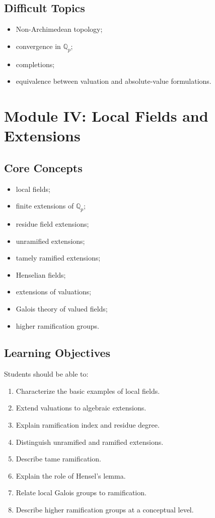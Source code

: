\documentclass[11pt,a4paper]{article}
\newcommand{\Q}{\mathbb Q}
\begin{document}
\subsection{Difficult Topics}

\begin{itemize}
    \item Non-Archimedean topology;
    \item convergence in \(\Q_p\);
    \item completions;
    \item equivalence between valuation and absolute-value
    formulations.
\end{itemize}

\section{Module IV: Local Fields and Extensions}

\subsection{Core Concepts}

\begin{itemize}
    \item local fields;
    \item finite extensions of \(\Q_p\);
    \item residue field extensions;
    \item unramified extensions;
    \item tamely ramified extensions;
    \item Henselian fields;
    \item extensions of valuations;
    \item Galois theory of valued fields;
    \item higher ramification groups.
\end{itemize}

\subsection{Learning Objectives}

Students should be able to:

\begin{enumerate}
    \item Characterize the basic examples of local fields.
    \item Extend valuations to algebraic extensions.
    \item Explain ramification index and residue degree.
    \item Distinguish unramified and ramified extensions.
    \item Describe tame ramification.
    \item Explain the role of Hensel's lemma.
    \item Relate local Galois groups to ramification.
    \item Describe higher ramification groups at a conceptual level.
\end{enumerate}
\end{document}

